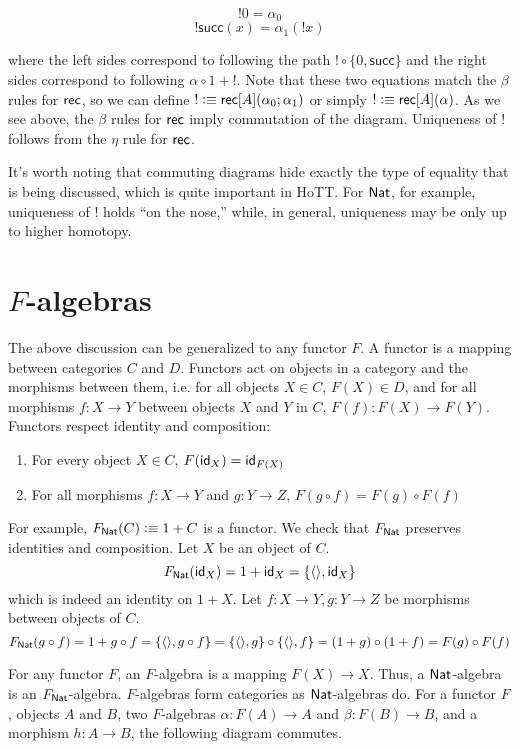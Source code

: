 \documentclass[11pt]{article}
\newcommand*{\z}{0}
\newcommand*{\s}{\mathsf{succ}}
\newcommand*{\triv}{\langle \rangle}
\newcommand*{\comp}{\circ}
\begin{document}
\[! \z = \alpha_0 \]
\[! \s(x) = \alpha_1(! x)\]

where the left sides correspond to following the path $! \comp \{\z, \s\}$
and the right sides correspond to following $\alpha \comp 1 + !$. Note that
these two equations match the $\beta$ rules for $\mathsf{rec}$, so we can define
$! \vcentcolon\equiv \mathsf{rec}[A](\alpha_0; \alpha_1)$ or simply $! \vcentcolon\equiv \mathsf{rec}[A](\alpha)$.
As we see above, the $\beta$ rules for $\mathsf{rec}$ imply
commutation of the diagram. Uniqueness of $!$ follows from the $\eta$ rule
for $\mathsf{rec}$.

It's worth noting that commuting diagrams hide exactly the type of equality
that is being discussed, which is quite
important in HoTT. For $\mathsf{Nat}$, for example, uniqueness of $!$ holds ``on
the nose,'' while, in general, uniqueness may be only up to higher homotopy.

\section{$F$-algebras}
The above discussion can be generalized to any functor $F$. A functor is
a mapping between categories $C$ and $D$. Functors act on objects in a
category and the morphisms between them, i.e. for all objects $X \in C$,
$F(X) \in D$, and for all morphisms $f: X \to Y$ between objects $X$ and $Y$
in $C$, $F(f): F(X) \to F(Y)$. 
Functors respect identity and composition:
  \begin{enumerate}
  \item For every object $X \in C$, $F(\textsf{id}_X) = \textsf{id}_{F(X)}$
  \item For all morphisms $f: X \to Y$ and $g: Y \to Z$, 
    $F(g\comp f) = F(g)\comp F(f)$
  \end{enumerate}
\cite{WikiFunctor}

For example, $F_{\mathsf{Nat}}(C) \vcentcolon\equiv 1 + C$ is a functor. We check that $F_{\mathsf{Nat}}$
preserves identities and composition. Let $X$ be an object of $C$.
\[F_\Nat(\id_X) = 1 + \id_X = \{\triv, \id_X\}\]
which is indeed an identity
on $1 + X$. Let $f: X\to Y, g: Y \to Z$ be morphisms between objects of $C$.
\[F_\Nat(g \comp f) = 1 + g \comp f = \{\triv, g \comp f\} =
\{\triv, g\} \comp \{\triv, f\} = (1 + g) \comp (1 + f) = F(g) \comp F(f)\]

For any functor $F$, an $F$-algebra is a mapping $F(X) \to X$. Thus,
a $\mathsf{Nat}$-algebra is an $F_{\mathsf{Nat}}$-algebra. $F$-algebras form categories as
$\mathsf{Nat}$-algebras do. For a functor $F$, objects $A$ and $B$, two $F$-algebras
$\alpha: F(A) \to A$ and $\beta: F(B) \to B$, and a morphism $h: A \to B$,
the following diagram commutes.
\end{document}
